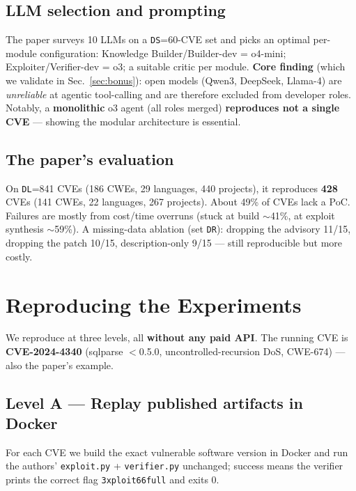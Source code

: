 \documentclass[conference,10pt,a4paper]{IEEEtran}
\newcommand{\code}[1]{\texttt{\small #1}}
\begin{document}
\subsection{LLM selection and prompting}
The paper surveys 10 LLMs on a \code{DS}=60-CVE set and picks an optimal per-module configuration: Knowledge Builder/Builder-dev = o4-mini; Exploiter/Verifier-dev = o3; a suitable critic per module. \textbf{Core finding} (which we validate in Sec.~\ref{sec:bonus}): open models (Qwen3, DeepSeek, Llama-4) are \textit{unreliable} at agentic tool-calling and are therefore excluded from developer roles. Notably, a \textbf{monolithic} o3 agent (all roles merged) \textbf{reproduces not a single CVE} --- showing the modular architecture is essential.

\subsection{The paper's evaluation}
On \code{DL}=841 CVEs (186 CWEs, 29 languages, 440 projects), it reproduces \textbf{428} CVEs (141 CWEs, 22 languages, 267 projects). About 49\% of CVEs lack a PoC. Failures are mostly from cost/time overruns (stuck at build $\sim$41\%, at exploit synthesis $\sim$59\%). A missing-data ablation (set \code{DR}): dropping the advisory 11/15, dropping the patch 10/15, description-only 9/15 --- still reproducible but more costly.

\section{Reproducing the Experiments}

We reproduce at three levels, all \textbf{without any paid API}. The running CVE is \textbf{CVE-2024-4340} (sqlparse $<$0.5.0, uncontrolled-recursion DoS, CWE-674) --- also the paper's example.

\subsection{Level A --- Replay published artifacts in Docker}
For each CVE we build the exact vulnerable software version in Docker and run the authors' \code{exploit.py} + \code{verifier.py} unchanged; success means the verifier prints the correct flag \code{3xploit66full} and exits 0.
\end{document}
